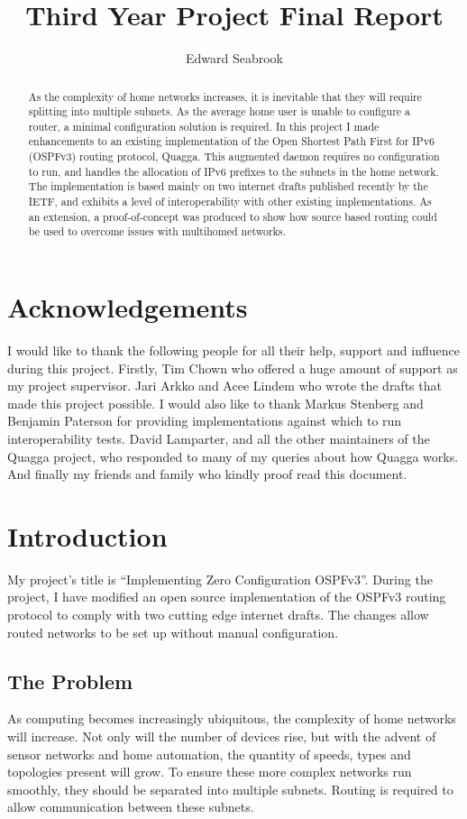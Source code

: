 \documentclass[12pt,a4paper,twoside]{report}
\author{Edward Seabrook}
\title{Third Year Project Final Report}
\begin{document}


\begin{abstract}
As the complexity of home networks increases, it is inevitable that they will
require splitting into multiple subnets. As the average home user is unable to
configure a router, a minimal configuration solution is required. In this
project I made enhancements to an existing implementation of the Open Shortest
Path First for IPv6 (OSPFv3) routing protocol, Quagga. This augmented daemon
requires no configuration to run, and handles the allocation of IPv6 prefixes
to the subnets in the home network. The implementation is based mainly on two
internet drafts published recently by the IETF\@{}, and exhibits a level of interoperability with other
existing implementations. As an extension, a proof-of-concept was produced to
show how source based routing could be used to overcome issues with multihomed
networks. 
\end{abstract}

\tableofcontents
\clearpage

\chapter*{Acknowledgements}
I would like to thank the following people for all their help, support and
influence during this project. Firstly, Tim Chown who offered a huge amount of
support as my project supervisor. Jari Arkko and Acee Lindem who wrote the
drafts that made this project possible. I would also like to thank Markus
Stenberg and Benjamin Paterson for providing implementations against which to
run interoperability tests. David Lamparter, and all the other maintainers of
the Quagga project, who responded to many of my queries about how Quagga works.
And finally my friends and family who kindly proof read this document.

\chapter{Introduction}
My project's title is ``Implementing Zero Configuration OSPFv3''. During the
project, I have modified an open source implementation of the OSPFv3 routing
protocol to comply with two cutting edge internet drafts. The changes allow
routed networks to be set up without manual configuration.

\section{The Problem}
As computing becomes increasingly ubiquitous, the complexity of home networks
will increase. Not only will the number of devices rise, but with the advent of
sensor networks and home automation, the quantity of speeds, types and
topologies present will grow. To ensure these more complex networks run
smoothly, they should be separated into multiple subnets. Routing is required
to allow communication between these subnets. 
\end{document}
